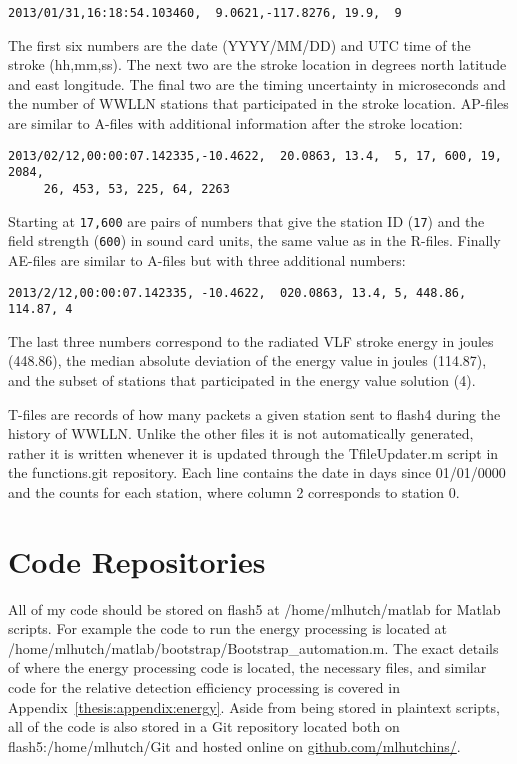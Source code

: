 \begin{verbatim}
2013/01/31,16:18:54.103460,  9.0621,-117.8276, 19.9,  9
\end{verbatim}

The first six numbers are the date (YYYY/MM/DD) and UTC time of the stroke (hh,mm,ss).
The next two are the stroke location in degrees north latitude and east longitude.
The final two are the timing uncertainty in microseconds and the number of WWLLN stations that participated in the stroke location.
AP-files are similar to A-files with additional information after the stroke location:

\begin{verbatim}
2013/02/12,00:00:07.142335,-10.4622,  20.0863, 13.4,  5, 17, 600, 19, 2084,
	 26, 453, 53, 225, 64, 2263
\end{verbatim}

Starting at \verb|17,600| are pairs of numbers that give the station ID (\verb|17|) and the field strength (\verb|600|) in sound card units, the same value as in the R-files. Finally AE-files are similar to A-files but with three additional numbers:

\begin{verbatim}
2013/2/12,00:00:07.142335, -10.4622,  020.0863, 13.4, 5, 448.86, 114.87, 4
\end{verbatim}

The last three numbers correspond to the radiated VLF stroke energy in joules (448.86), the median absolute deviation of the energy value in joules (114.87), and the subset of stations that participated in the energy value solution (4).

T-files are records of how many packets a given station sent to flash4 during the history of WWLLN.
Unlike the other files it is not automatically generated, rather it is written whenever it is updated through the TfileUpdater.m script in the functions.git repository.
Each line contains the date in days since 01/01/0000 and the counts for each station, where column 2 corresponds to station 0.

\section{Code Repositories}

All of my code should be stored on flash5 at /home/mlhutch/matlab for Matlab scripts.
For example the code to run the energy processing is located at /home/mlhutch/matlab/bootstrap/Bootstrap\_automation.m.
The exact details of where the energy processing code is located, the necessary files, and similar code for the relative detection efficiency processing is covered in Appendix~\ref{thesis:appendix:energy}.
Aside from being stored in plaintext scripts, all of the code is also stored in a Git repository located both on flash5:/home/mlhutch/Git and hosted online on \href{http://github.com/mlhutchins}{github.com/mlhutchins/}.

